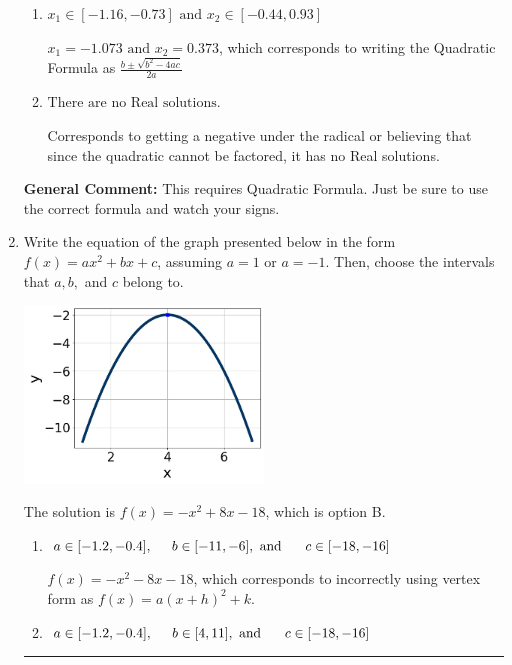 \documentclass{extbook}[14pt]
\newcommand{\litem}[1]{\item #1

\rule{\textwidth}{0.4pt}}
\begin{document}
\begin{enumerate}
{\begin{enumerate}[label=\Alph*.]
 $x_1 = -10.728 \text{ and } x_2 = 3.728$, which corresponds to using the Quadratic Formula with $a=1$
\item \( x_1 \in [-1.16, -0.73] \text{ and } x_2 \in [-0.44, 0.93] \)

 $x_1 = -1.073 \text{ and } x_2 = 0.373$, which corresponds to writing the Quadratic Formula as $\frac{b \pm \sqrt{b^2 - 4ac}}{2a}$
\item \( \text{There are no Real solutions.} \)

Corresponds to getting a negative under the radical or believing that since the quadratic cannot be factored, it has no Real solutions.
\end{enumerate}

\textbf{General Comment:} This requires Quadratic Formula. Just be sure to use the correct formula and watch your signs.
}
\litem{
Write the equation of the graph presented below in the form $f(x)=ax^2+bx+c$, assuming  $a=1$ or $a=-1$. Then, choose the intervals that $a, b,$ and $c$ belong to.

\begin{center}
    \includegraphics[width=0.5\textwidth]{../Figures/quadraticGraphToEquationB.png}
\end{center}



The solution is \( f(x) = -x^{2} +8 x -18 \), which is option B.\begin{enumerate}[label=\Alph*.]
\item \( a \in [-1.2, -0.4], \hspace*{5mm} b \in [-11, -6], \text{ and } \hspace*{5mm} c \in [-18, -16] \)

$f(x)=-x^{2} -8 x -18$, which corresponds to incorrectly using vertex form as $f(x) = a(x+h)^2+k$.
\item \( a \in [-1.2, -0.4], \hspace*{5mm} b \in [4, 11], \text{ and } \hspace*{5mm} c \in [-18, -16] \)


\end{enumerate}}
\end{enumerate}
\end{document}
